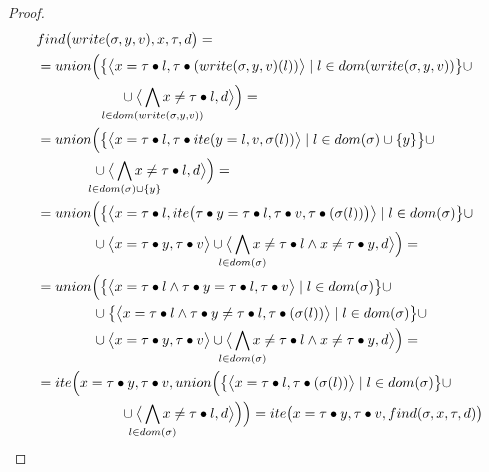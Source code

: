 \begin{proof}
\begin{align*}
&\finD{\mutate{\sigma}{y}{v}}{x}{\tau}{d}=\\
&=\cmpbody{x}{\mutate{\sigma}{y}{v}}{\tau}{d}=\\
&=\Union{\big\{\paiR{\mg{x}{\fillterm{\tau}{l}}}{\fillterm{\tau}{\ite{\mg{y}{l}}{v}{\sigma(l)}}} \mid l\in\dom{\sigma}\cup\{y\} \big\}\cup\\
    &\qquad\qquad\cup\paiR{\bigwedge_{\mathclap{l\in\dom{\sigma}\cup\{y\}}}{\nmg{x}{\fillterm{\tau}{l}}}}{d}}=\\
&=\Union{\big\{\paiR{\mg{x}{\fillterm{\tau}{l}}}{\Ite{\mg{\fillterm{\tau}{y}}{\fillterm{\tau}{l}}}{\fillterm{\tau}{v}}{\fillterm{\tau}{(\sigma(l))}}} \mid l\in\dom{\sigma} \big\}\cup\\
	&\qquad\qquad\cup\paiR{\mg{x}{\fillterm{\tau}{y}}}{\fillterm{\tau}{v}}\cup\paiR{\bigwedge_{\mathclap{l\in\dom{\sigma}}}{\nmg{x}{\fillterm{\tau}{l}}}\wedge\nmg{x}{\fillterm{\tau}{y}}}{d}}=\\
&=\Union{\big\{\paiR{\mg{x}{\fillterm{\tau}{l}}\wedge\mg{\fillterm{\tau}{y}}{\fillterm{\tau}{l}}}{\fillterm{\tau}{v}} \mid l\in\dom{\sigma} \big\}\cup\\
    &\qquad\qquad\cup\big\{\paiR{\mg{x}{\fillterm{\tau}{l}}\wedge\nmg{\fillterm{\tau}{y}}{\fillterm{\tau}{l}}}{\fillterm{\tau}{(\sigma(l))}} \mid l\in\dom{\sigma} \big\}\cup\\
	&\qquad\qquad\cup\paiR{\mg{x}{\fillterm{\tau}{y}}}{\fillterm{\tau}{v}}\cup\paiR{\bigwedge_{\mathclap{l\in\dom{\sigma}}}{\nmg{x}{\fillterm{\tau}{l}}}\wedge\nmg{x}{\fillterm{\tau}{y}}}{d}}=\\
&=\ITE{\mg{x}{\fillterm{\tau}{y}}}{\fillterm{\tau}{v}}{\cmpbody{x}{\sigma}{\tau}{d}}=\Ite{\mg{x}{\fillterm{\tau}{y}}}{\fillterm{\tau}{v}}{\find{\sigma}{x}{\tau}{d}}
\end{align*}
\end{proof}
